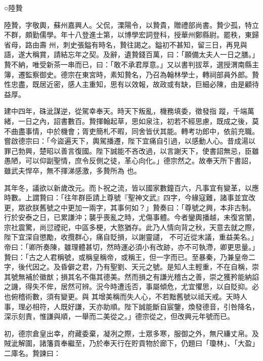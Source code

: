 
\begin{pinyinscope}

 ○陸贄



 陸贄，字敬輿，蘇州嘉興人。父侃，溧陽令，以贄貴，贈禮部尚書。贄少孤，特立不群，頗勤儒學。年十八登進士第，以博學宏詞登科，授華州鄭縣尉。罷秩，東歸省母，路由壽
 州，刺史張鎰有時名，贄往謁之。鎰初不甚知，留三日，再見與語，遂大稱賞，請結忘年之契。及辭，遺贄錢百萬，曰：「願備太夫人一日之膳。」贄不納，唯受新茶一串而已，曰：「敢不承君厚意。」又以書判拔萃，選授渭南縣主簿，遷監察御史。德宗在東宮時，素知贄名，乃召為翰林學士，轉祠部員外郎。贄性忠盡，既居近密，感人主重知，思有以效報，故政或有缺，巨細必陳，由是顧待益厚。



 建中四年，硃泚謀逆，從駕幸奉天。時天下叛亂，機務填委，徵發指
 蹤，千端萬緒，一日之內，詔書數百。贄揮翰起草，思如泉注，初若不經思慮，既成之後，莫不曲盡事情，中於機會；胥吏簡札不暇，同舍皆伏其能。轉考功郎中，依前充職。嘗啟德宗曰：「今盜遍天下，輿駕播遷，陛下宜痛自引過，以感動人心。昔成湯以罪己勃興，楚昭以善言復國。陛下誠能不吝改過，以言謝天下，使書詔無忌，臣雖愚陋，可以仰副聖情，庶令反側之徒，革心向化。」德宗然之。故奉天所下書詔，雖武夫悍卒，無不揮涕感激，多贄所為
 也。



 其年冬，議欲以新歲改元。而卜祝之流，皆以國家數鐘百六，凡事宜有變革，以應時數。上謂贄曰：「往年群臣請上尊號『聖神文武』四字，今緣寇難，諸事並宜改更，眾欲朕舊號之中更加一兩字，其事何如？」贄奏曰：「尊號之興，本非古制。行於安泰之日，已累謙沖；襲乎喪亂之時，尤傷事體。今者鑾輿播越，未復宮闈，宗社震驚，尚愆禋祀，中區多梗，大憝猶存。此乃人情向背之秋，天意去就之際，陛下宜深自懲勵，收攬群心，痛自貶損，以謝靈譴，
 不可近從末議，重益美名。」帝曰：「卿所奏陳，雖理體甚切，然時運必須小有改跡，亦不可執滯，卿更思量。」贄曰：「古之人君稱號，或稱皇稱帝，或稱王，但一字而已。至暴秦，乃兼皇帝二字，後代因之。及昏僻之君，乃有聖劉、天元之號。是知人主輕重，不在自稱，崇其號無補於徽猷；損其名不傷其德美。然而損之有謙光稽古之善，崇之獲矜能納諂之譏，得失不侔，居然可辨。況今時遭迍否，事屬傾危，尤宜懼思，以自貶抑。必也俯稽術數，須有變更。與
 其增美稱而失人心，不若黜舊號以祗天戒。天時人事，理必相符，人既好謙，天亦助順。陛下誠能斷自宸鑒，煥發德音，引咎降名，深示刻責，惟謙與順，一舉而二美從之。」德宗從之，但改興元年號而已。



 初，德宗倉皇出幸，府藏委棄，凝冽之際，士眾多寒，服御之外，無尺縑丈帛。及賊泚解圍，諸籓貢奉繼至，乃於奉天行在貯貢物於廊下，仍題曰「瓊林」、「大盈」二庫名。贄諫曰：




\end{pinyinscope}
